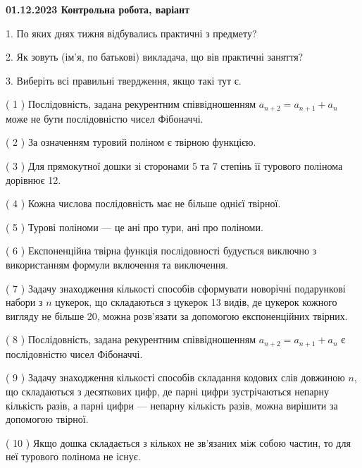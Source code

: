 \documentclass[12pt, ukrainian]{article}
\begin{document}
\vspace{4mm}
\newpage
\begin {large}

\textbf{01.12.2023 Контрольна робота, варіант  }\par


{
1. По яких днях тижня відбувались практичні з предмету?



\vspace{5mm}
2. Як зовуть (ім'я, по батькові) викладача, що вів практичні заняття?



\vspace{5mm}
3. Виберіть всі правильні твердження, якщо такі тут є.\par
\vspace{2mm}
( 1 ) Послідовність, задана рекурентним співвідношенням $a_{n+2}=a_{n+1}+a_{n}$ може не бути послідовністю чисел Фібоначчі.%

( 2 ) За означенням туровий поліном є твірною функцією.%

( 3 ) Для прямокутної дошки зі сторонами 5 та 7 степінь її турового полінома дорівнює 12.%

( 4 ) Кожна числова послідовність має не більше однієї твірної.%

( 5 ) Турові поліноми --- це ані про тури, ані про поліноми.%

( 6 ) Експоненційна твірна функція послідовності будується виключно з використанням формули включення та виключення.%

( 7 ) Задачу знаходження кількості способів сформувати новорічні подарункові набори з $n$ цукерок, що складаються з цукерок 13 видів, де цукерок кожного вигляду не більше 20, можна розв’язати за допомогою експоненційних твірних.%

( 8 ) Послідовність, задана рекурентним співвідношенням $a_{n+2}=a_{n+1}+a_{n}$ є послідовністю чисел Фібоначчі.%

( 9 ) Задачу знаходження кількості способів складання кодових слів довжиною $n$, що складаються з десяткових цифр, де парні цифри зустрічаються непарну кількість разів, а парні цифри — непарну кількість разів, можна вирішити за допомогою твірної.%

( 10 ) Якщо дошка складається з кількох не зв’язаних між собою частин, то для неї турового полінома не існує.%
}
\end {large}

\vspace{4mm}
\newpage
\end{document}

